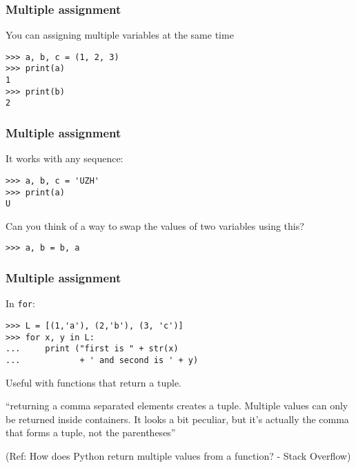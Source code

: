 \begin{frame}[fragile]
\frametitle{Multiple assignment}
You can assigning multiple variables at the same time
\begin{lstlisting}
>>> a, b, c = (1, 2, 3)
>>> print(a)
1
>>> print(b)
2
\end{lstlisting}
\end{frame}



\begin{frame}[fragile]
\frametitle{Multiple assignment}
It works with any sequence:

\begin{lstlisting}
>>> a, b, c = 'UZH'
>>> print(a)
U
\end{lstlisting}



  Can you think of a way to swap the values of two variables using this?


\begin{lstlisting}
>>> a, b = b, a
\end{lstlisting}
\end{frame}


\begin{frame}[fragile]\frametitle{Multiple assignment}
In \texttt{for}:
\begin{lstlisting}
>>> L = [(1,'a'), (2,'b'), (3, 'c')]
>>> for x, y in L:
...     print ("first is " + str(x)
...            + ' and second is ' + y)
\end{lstlisting}

  
Useful with functions that return a tuple.

``returning a comma separated elements creates a tuple. Multiple values can only be returned inside containers. It looks a bit peculiar, but it’s actually the comma that forms a tuple, not the parentheses''

\tiny{(Ref: How does Python return multiple values from a function? - Stack Overflow)}

\end{frame}

